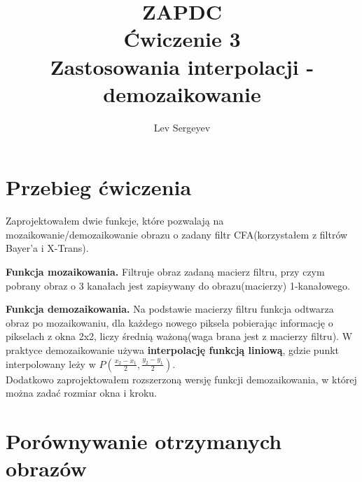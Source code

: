 \documentclass{article}
\author{Lev Sergeyev}
\title{ZAPDC \\ Ćwiczenie 3 \\ Zastosowania interpolacji - demozaikowanie}
\date{ }
\begin{document}
\maketitle


\section{Przebieg ćwiczenia}
Zaprojektowałem dwie funkcje, które pozwalają na mozaikowanie/demozaikowanie obrazu o zadany filtr CFA(korzystałem z filtrów Bayer'a i X-Trans).  \\
\par
\textbf{Funkcja mozaikowania.} Filtruje obraz zadaną macierz filtru, przy czym pobrany obraz o 3 kanałach jest zapisywany do obrazu(macierzy) 1-kanałowego. \\
\par
\textbf{Funkcja demozaikowania.} Na podstawie macierzy filtru funkcja odtwarza obraz po mozaikowaniu, dla każdego nowego piksela pobierając informację o pikselach z okna 2x2, liczy średnią ważoną(waga brana jest z macierzy filtru). W praktyce demozaikowanie używa \textbf{interpolację funkcją liniową}, gdzie punkt interpolowany leży w \( P( \frac{x_2 - x_1}{2} , \frac{y_2 - y_1}{2} ) \). \\
Dodatkowo zaprojektowałem rozszerzoną wersję funkcji demozaikowania, w której można zadać rozmiar okna i kroku.

\section{Porównywanie otrzymanych obrazów}
\end{document}
